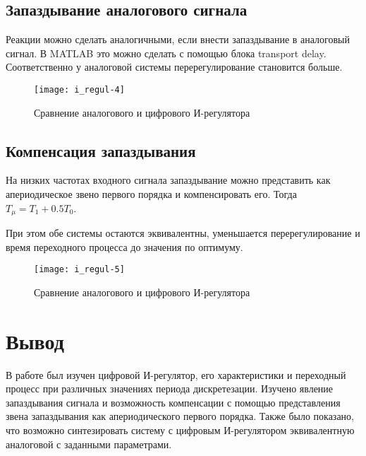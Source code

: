     \subsection{Запаздывание аналогового сигнала}
    Реакции можно сделать аналогичными, если внести запаздывание в аналоговый сигнал.
    В MATLAB это можно сделать с помощью блока transport delay. Соответственно у аналоговой системы перерегулирование
    становится больше.
    \begin{figure}[H]
        \centering\texttt{[image: i\_regul-4]}
        \caption{Сравнение аналогового и цифрового И-регулятора}
    \end{figure}

    \subsection{Компенсация запаздывания}
    На низких частотах входного сигнала запаздывание можно представить как апериодическое звено первого порядка и
    компенсировать его. Тогда $T_\mu = T_1 + 0.5T_0$.

    При этом обе системы остаются эквивалентны, уменьшается перерегулирование и время переходного процесса до значения
    по оптимуму.
    \begin{figure}[H]
        \centering\texttt{[image: i\_regul-5]}
        \caption{Сравнение аналогового и цифрового И-регулятора}
    \end{figure}


    \section{Вывод}
    В работе был изучен цифровой И-регулятор, его характеристики и переходный процесс при различных значениях периода
    дискретезации.
    Изучено явление запаздывания сигнала и возможность компенсации с помощью представления звена запаздывания как
    апериодического первого порядка.
    Также было показано, что возможно синтезировать систему с цифровым И-регулятором эквивалентную
    аналоговой с заданными параметрами.

